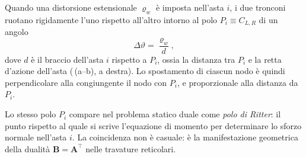\begin{oss}
	Quando una distorsione estensionale $\varrho_w$ è imposta nell'asta
	$i$, i due tronconi ruotano rigidamente l'uno rispetto all'altro
	intorno al polo $P_i\equiv C_{L,R}$ di un angolo
	\begin{equation}\label{eq:rotazione_polo}
		\Delta\vartheta = \frac{\varrho_w}{d},
	\end{equation}
	dove $d$ è il braccio dell'asta $i$ rispetto a $P_i$, ossia la
	distanza tra $P_i$ e la retta d'azione dell'asta
	(\,(a--b), a destra). Lo spostamento di ciascun nodo è
	quindi perpendicolare alla congiungente il nodo con $P_i$, e
	proporzionale alla distanza da $P_i$.
	
	Lo stesso polo $P_i$ compare nel problema statico duale come
	\emph{polo di Ritter}: il punto rispetto al quale si scrive
	l'equazione di momento per determinare lo sforzo normale nell'asta
	$i$. La coincidenza non è casuale: è la manifestazione geometrica
	della dualità $\bm{B} = \bm{A}^{\top}$ nelle travature reticolari.
\end{oss}

